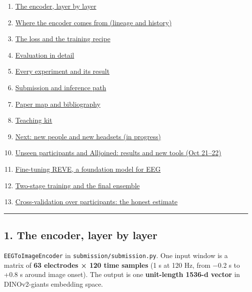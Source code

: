 \documentclass[
  11pt,
]{article}
\providecommand{\tightlist}{%
  \setlength{\itemsep}{0pt}\setlength{\parskip}{0pt}}
\renewcommand{\_}{\oldunderscore\allowbreak}
\begin{document}
\begin{enumerate}
\def\labelenumi{\arabic{enumi}.}
\tightlist
\item
  \hyperref[1-the-encoder-layer-by-layer]{The
  encoder, layer by layer}
\item
  \hyperref[2-where-the-encoder-comes-from]{Where
  the encoder comes from (lineage and
  history)}
\item
  \hyperref[3-the-loss-and-the-training-recipe]{The
  loss and the training recipe}
\item
  \hyperref[4-evaluation-in-detail]{Evaluation
  in detail}
\item
  \hyperref[5-every-experiment-and-its-result]{Every
  experiment and its result}
\item
  \hyperref[6-submission-and-inference-path]{Submission
  and inference path}
\item
  \hyperref[7-paper-map-and-bibliography]{Paper
  map and bibliography}
\item
  \hyperref[8-teaching-kit]{Teaching
  kit}
\item
  \hyperref[9-next-new-people-and-new-headsets-in-progress]{Next:
  new people and new headsets (in
  progress)}
\item
  \hyperref[10-unseen-participants-and-alljoined-results-and-new-tools-oct-2122]{Unseen
  participants and Alljoined: results
  and new tools (Oct 21--22)}
\item
  \hyperref[11-fine-tuning-reve-a-foundation-model-for-eeg]{Fine-tuning
  REVE, a foundation model for EEG}
\item
  \hyperref[12-two-stage-training-and-the-final-ensemble]{Two-stage
  training and the final ensemble}
\item
  \hyperref[13-cross-validation-over-participants-the-honest-estimate]{Cross-validation
  over participants: the honest
  estimate}
\end{enumerate}

\begin{center}\rule{0.5\linewidth}{0.5pt}\end{center}

\subsection{1. The encoder, layer by
layer}\label{the-encoder-layer-by-layer}

\texttt{EEGToImageEncoder} in
\texttt{submission/submission.py}. One
input window is a matrix of \textbf{63
electrodes × 120 time samples} (1 s at
120 Hz, from −0.2 s to +0.8 s around
image onset). The output is one
\textbf{unit-length 1536-d vector} in
DINOv2-giant\textquotesingle s embedding
space.
\end{document}
